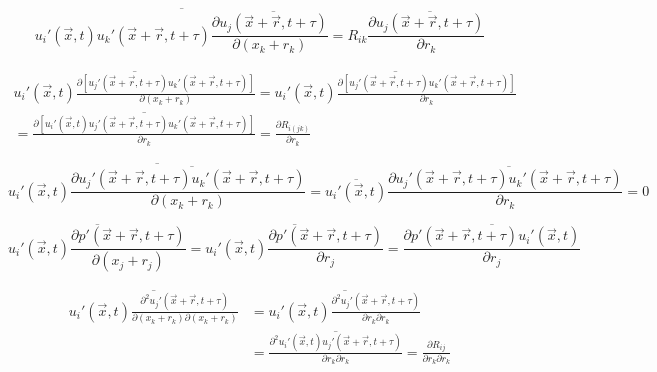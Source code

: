 \documentclass[paper=a4, fontsize=11pt]{scrartcl} %
\numberwithin{equation}{section} %
\numberwithin{figure}{section} %
\numberwithin{table}{section} %
\begin{document}
	 \begin{equation}
	 	\overline{u_i'(\vec{x}, t)u_k'(\vec{x} + \vec{r}, t + \tau)\frac{\partial \overline{u_j(\vec{x} + \vec{r}, t + \tau)}}{\partial (x_k+r_k)}} = R_{ik} \frac{\partial \overline{u_j(\vec{x} + \vec{r}, t + \tau)}}{\partial r_k}
	 \end{equation}
	 
	 \begin{equation}
	 	\begin{aligned}
	 		\overline{u_i'(\vec{x}, t) \frac{\partial [u_j'(\vec{x} + \vec{r}, t + \tau)u_k'(\vec{x} + \vec{r}, t + \tau)]}{\partial  (x_k+r_k)}} = \overline{u_i'(\vec{x}, t) \frac{\partial [u_j'(\vec{x} + \vec{r}, t + \tau)u_k'(\vec{x} + \vec{r}, t + \tau)]}{\partial r_k}}\\
	 		= \overline{\frac{\partial [u_i'(\vec{x}, t) u_j'(\vec{x} + \vec{r}, t + \tau)u_k'(\vec{x} + \vec{r}, t + \tau)]}{\partial r_k}} = \frac{\partial R_{i(jk)}}{\partial r_k}
	 	\end{aligned}
	 \end{equation}
	 
	 \begin{equation}
	 	\overline{u_i'(\vec{x}, t) \frac{\partial \overline{u_j'(\vec{x} + \vec{r}, t + \tau)u_k'(\vec{x} + \vec{r}, t + \tau)}}{\partial (x_k+r_k)}} = \overline{u_i'(\vec{x}, t)} \frac{\partial \overline{u_j'(\vec{x} + \vec{r}, t + \tau)u_k'(\vec{x} + \vec{r}, t + \tau)}}{\partial r_k} = 0
	 \end{equation}
	 
	 \begin{equation}
	 	\overline{u_i'(\vec{x}, t) \frac{\partial p'(\vec{x} + \vec{r}, t + \tau)}{\partial (x_j + r_j)}} = \overline{u_i'(\vec{x}, t) \frac{\partial p'(\vec{x} + \vec{r}, t + \tau)}{\partial r_j}} = \overline{\frac{\partial p'(\vec{x} + \vec{r}, t + \tau)u_i'(\vec{x}, t)}{\partial r_j}}
	 \end{equation}
	 
	 \begin{equation}
	 	\begin{aligned}
	 		\overline{u_i'(\vec{x}, t) \frac{\partial^2 u_j'(\vec{x} + \vec{r}, t + \tau)}{\partial (x_k+r_k) \partial (x_k+r_k)}}
	 		&= \overline{u_i'(\vec{x}, t) \frac{\partial^2 u_j'(\vec{x} + \vec{r}, t + \tau)}{\partial r_k \partial r_k}} \\
	 		& = \overline{ \frac{\partial^2 u_i'(\vec{x}, t) u_j'(\vec{x} + \vec{r}, t + \tau)}{\partial r_k \partial r_k}} = \frac{\partial R_{ij}}{\partial r_k \partial r_k}
	 	\end{aligned}
	 \end{equation}
	 
\end{document}
